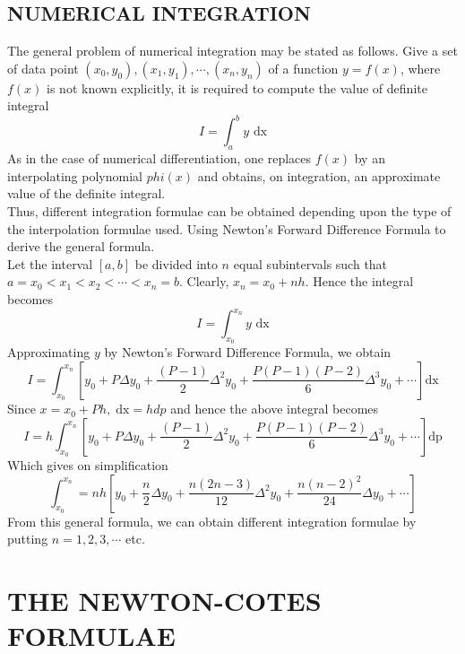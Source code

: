 \documentclass[12pt]{report}
\newcommand{\sps}{\\[0.2cm]}
\begin{document}
	\section{NUMERICAL INTEGRATION}
	The general problem of numerical integration may be stated as follows. Give a set of data point $(x_0,y_0), (x_1,y_1), \cdots,(x_n,y_n)$ of a function $y=f(x)$, where $f(x)$ is not known explicitly, it is required to compute the value of definite integral
	\begin{equation}
		I = \int_{a}^{b}y \text{ dx}
		\label{eq2_2}
	\end{equation}
	As in the case of numerical differentiation, one replaces $f(x)$ by an interpolating polynomial $phi(x)$ and obtains, on integration, an approximate value of the definite integral.\sps
	Thus, different integration formulae can be obtained depending upon the type of the interpolation formulae used. Using Newton's Forward Difference Formula to derive the general formula.\sps
	Let the interval $[a,b]$ be divided into $n$ equal subintervals such that $a = x_0 < x_1 < x_2 < \cdots < x_n = b$. Clearly, $x_n = x_0 + nh$. Hence the integral becomes
	$$
		I = \int_{x_0}^{x_n} y \text{ dx}
	$$
	Approximating $y$ by Newton's Forward Difference Formula, we obtain
	$$
		I = \int_{x_0}^{x_n}\left[ y_0 + P\Delta y_0 + \frac{(P-1)}{2}\Delta^2 y_0 + \frac{P(P-1)(P-2)}{6}\Delta^3 y_0 + \cdots \right]\text{dx}
	$$
	Since $x = x_0 + Ph, \; \text{dx} = hdp$ and hence the above integral becomes
	$$
		I = h\int_{x_0}^{x_n}\left[ y_0 + P\Delta y_0 + \frac{(P-1)}{2}\Delta^2 y_0 + \frac{P(P-1)(P-2)}{6}\Delta^3 y_0 + \cdots \right]\text{dp}
	$$
	Which gives on simplification
	\begin{equation}
		\int_{x_0}^{x_n} = nh\left[ y_0 + \frac{n}{2}\Delta y_0 + \frac{n(2n-3)}{12}\Delta^2 y_0 + \frac{n(n-2)^2}{24}\Delta y_0 + \cdots \right]
		\label{eq2_3}
	\end{equation}
	From this general formula, we can obtain different integration formulae by putting $n=1,2,3, \cdots$ etc.
	
	\newpage
	
	\chapter{THE NEWTON-COTES FORMULAE}
	
\end{document}
